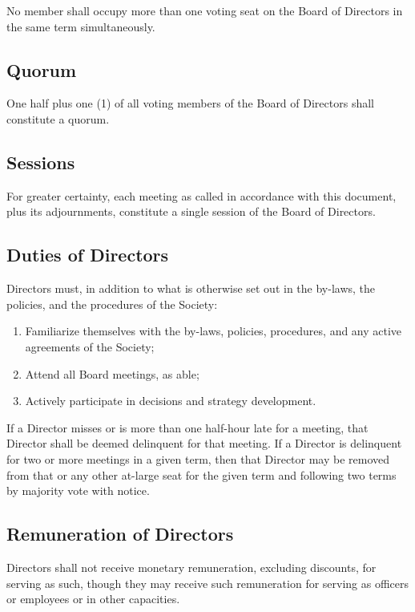 No member shall occupy more than one voting seat on the Board of Directors in
the same term simultaneously. 

\subsection{Quorum}
One half plus one (1) of all voting members of the Board of Directors shall
constitute a quorum.

\subsection{Sessions}
For greater certainty, each meeting as called in accordance with this document,
plus its adjournments, constitute a single session of the Board of Directors.

\subsection{Duties of Directors}
Directors must, in addition to what is otherwise set out in the by-laws, the
policies, and the procedures of the Society:
\begin{enumerate}
    \item Familiarize themselves with the by-laws, policies, 
        procedures, and any active agreements of the Society;
    \item Attend all Board meetings, as able;
    \item Actively participate in decisions and strategy development.
\end{enumerate}
If a Director misses or is more than one half-hour late for a meeting, that Director shall be deemed delinquent for that meeting. If a Director is delinquent for two or more meetings in a given term, then that Director may be removed from that or any other at-large seat for the given term and following two terms by majority vote with notice.

\subsection{Remuneration of Directors}
Directors shall not receive monetary remuneration, excluding discounts, for
serving as such, though they may receive such remuneration for serving as
officers or employees or in other capacities.

